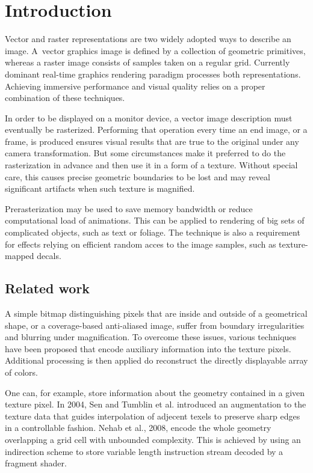 \section{Introduction}

Vector and raster representations are two widely adopted ways to describe an image. A~vector graphics image is defined by a collection of geometric primitives, whereas a raster image consists of samples taken on a regular grid. Currently dominant real-time graphics rendering paradigm processes both representations. Achieving immersive performance and visual quality relies on a proper combination of these techniques.

In order to be displayed on a monitor device, a vector image description must eventually be rasterized. Performing that operation every time an end image, or a frame, is produced ensures visual results that are true to the original under any camera transformation. But some circumstances make it preferred to do the rasterization in advance and then use it in a form of a texture. Without special care, this causes precise geometric boundaries to be lost and may reveal significant artifacts when such texture is magnified.

Prerasterization may be used to save memory bandwidth or reduce computational load of animations. This can be applied to rendering of big sets of complicated objects, such as text or foliage. The technique is also a requirement for effects relying on efficient random acces to the image samples, such as texture-mapped decals.

\subsection{Related work}

A simple bitmap distinguishing pixels that are inside and outside of a geometrical shape, or a coverage-based anti-aliased image, suffer from boundary irregularities and blurring under magnification. To overcome these issues, various techniques have been proposed that encode auxiliary information into the texture pixels. Additional processing is then applied do reconstruct the directly displayable array of colors.

One can, for example, store information about the geometry contained in a given texture pixel. In 2004, Sen \cite{sen04} and Tumblin et al. \cite{tumblin04} introduced an augmentation to the texture data that guides interpolation of adjecent texels to preserve sharp edges in a controllable fashion. Nehab et al., 2008, \cite{nehab08} encode the whole geometry overlapping a grid cell with unbounded complexity. This is achieved by using an indirection scheme to store variable length instruction stream decoded by a fragment shader.

